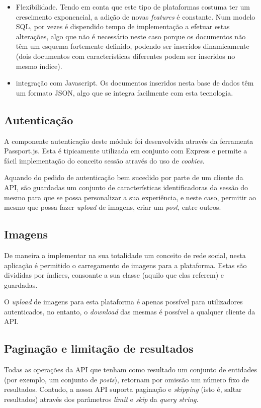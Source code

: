 \begin{itemize}
	\item Flexibilidade. Tendo em conta que este tipo de plataformas costuma ter um crescimento exponencial, a adição de novas \textit{features} é constante. Num modelo SQL, por vezes é dispendido tempo de implementação a efetuar estas alterações, algo que não é necessário neste caso porque os documentos não têm um esquema fortemente definido, podendo ser inseridos dinamicamente (dois documentos com características diferentes podem ser inseridos no mesmo índice).
	\item integração com Javascript. Os documentos inseridos nesta base de dados têm um formato JSON, algo que se integra facilmente com esta tecnologia.
\end{itemize} 

\subsection{Autenticação}
A componente autenticação deste módulo foi desenvolvida através da ferramenta Passport.js. Esta é tipicamente utilizada em conjunto com Express e permite a fácil implementação do conceito sessão através do uso de \textit{cookies}. \par \medskip

Aquando do pedido de autenticação bem sucedido por parte de um cliente da API, são guardadas um conjunto de características identificadoras da sessão do mesmo para que se possa personalizar a sua experiência, e neste caso, permitir ao mesmo que possa fazer \textit{upload} de imagens, criar um \textit{post}, entre outros. \par \medskip

\subsection{Imagens}
De maneira a implementar na sua totalidade um conceito de rede social, nesta aplicação é permitido o carregamento de imagens para a plataforma. Estas são divididas por índices, consoante a sua classe (aquilo que elas referem) e guardadas. \par \medskip

O \textit{upload} de imagens para esta plataforma é apenas possível para utilizadores autenticados, no entanto, o \textit{download} das mesmas é possível a qualquer cliente da API.

\subsection{Paginação e limitação de resultados}
Todas as operações da API que tenham como resultado um conjunto de entidades (por exemplo, um conjunto de \textit{posts}), retornam por omissão um número fixo de resultados. Contudo, a nossa API suporta paginação e \textit{skipping} (isto é, saltar resultados) através dos parâmetros \textit{limit} e \textit{skip} da \textit{query string}.

